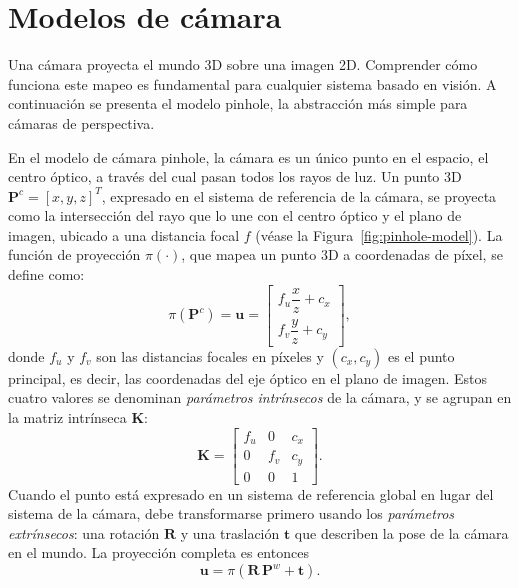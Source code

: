 
\section{Modelos de cámara}

Una cámara proyecta el mundo 3D sobre una imagen 2D. Comprender cómo funciona este mapeo es fundamental para cualquier sistema basado en visión. A continuación se presenta el modelo pinhole, la abstracción más simple para cámaras de perspectiva.

En el modelo de cámara pinhole, la cámara es un único punto en el espacio, el centro óptico, a través del cual pasan todos los rayos de luz. Un punto 3D $\mathbf{P}^c = [x, y, z]^T$, expresado en el sistema de referencia de la cámara, se proyecta como la intersección del rayo que lo une con el centro óptico y el plano de imagen, ubicado a una distancia focal $f$ (véase la Figura~\ref{fig:pinhole-model}). La función de proyección $\pi(\cdot)$, que mapea un punto 3D a coordenadas de píxel, se define como:
\begin{equation}
    \pi\!\left(\mathbf{P}^c\right) = \mathbf{u} =
    \begin{bmatrix}
        f_u \dfrac{x}{z} + c_x \\[6pt]
        f_v \dfrac{y}{z} + c_y
    \end{bmatrix},
    \label{eq:pinhole}
\end{equation}
donde $f_u$ y $f_v$ son las distancias focales en píxeles y $(c_x, c_y)$ es el punto principal, es decir, las coordenadas del eje óptico en el plano de imagen. Estos cuatro valores se denominan \textit{parámetros intrínsecos} de la cámara, y se agrupan en la matriz intrínseca $\mathbf{K}$:
\begin{equation}
    \mathbf{K} =
    \begin{bmatrix}
        f_u & 0   & c_x \\
        0   & f_v & c_y \\
        0   & 0   & 1
    \end{bmatrix}.
    \label{eq:intrinsics}
\end{equation}
Cuando el punto está expresado en un sistema de referencia global en lugar del sistema de la cámara, debe transformarse primero usando los \textit{parámetros extrínsecos}: una rotación $\mathbf{R}$ y una traslación $\mathbf{t}$ que describen la pose de la cámara en el mundo. La proyección completa es entonces
\begin{equation}
    \mathbf{u} = \pi\!\left(\mathbf{R}\,\mathbf{P}^w + \mathbf{t}\right).
    \label{eq:full_projection}
\end{equation}

